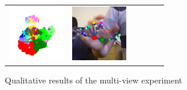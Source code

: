 \begin{figure}
\begin{tabular}{@{}cc@{}c@{}c@{}c@{}c@{}}
		\includegraphics[width=2.4cm]{fig/hand/qual/class/class-440.png} &
		\includegraphics[width=2.4cm]{fig/hand/qual/vote/image_0440.png} 
		\label{fig/hand/multi7} \\
	\end{tabular}
	\caption{Qualitative results of the multi-view experiment}
	\label{fig/hand/multiqual}
\end{figure} 
